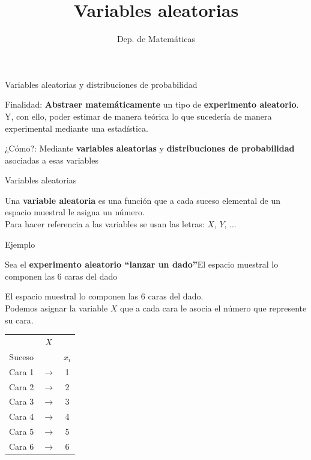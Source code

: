 \documentclass[11pt]{beamer}
\title{Variables aleatorias}
\date{}
\author{Dep. de Matemáticas}
\begin{document}
\begin{frame}
\titlepage
\end{frame}


\begin{frame}{Variables aleatorias y distribuciones de probabilidad}
\begin{block}{Finalidad:} \textbf{Abstraer matemáticamente} un tipo de \textbf{experimento aleatorio}. Y, con ello, poder estimar de manera teórica lo que sucedería de manera experimental mediante una estadística.
\end{block}

\pause

\begin{block}{¿Cómo?:} Mediante \textbf{variables aleatorias} y \textbf{distribuciones de probabilidad} asociadas a esas variables

\end{block}


\end{frame}

\begin{frame}{Variables aleatorias}
\begin{block}{}
Una \textbf{variable aleatoria} es una función que a cada suceso
elemental de un espacio muestral le asigna un número. \\ Para hacer referencia a las variables se usan las letras: $X$, $Y$, ...
\end{block}
\end{frame}

\begin{frame}{Ejemplo}
\begin{block}{}
Sea el \textbf{experimento aleatorio “lanzar un dado”}El espacio muestral lo componen las 6 caras del dado 
\end{block}
\pause
El espacio muestral lo componen las 6 caras del dado.\\
Podemos asignar la variable $X$ que a cada cara le asocia el número que represente su cara.
\begin{center}
\begin{tabular}{ccc}
 & $X$ &  \\
Suceso &  &  $x_i$\\ \hline 
Cara 1 & $\rightarrow$ & 1 \\ 
Cara 2 & $\rightarrow$ & 2 \\ 
Cara 3 & $\rightarrow$ & 3 \\ 
Cara 4 & $\rightarrow$ & 4 \\ 
Cara 5 & $\rightarrow$ & 5 \\ 
Cara 6 & $\rightarrow$ & 6 \\ 
\end{tabular} 
\end{center}
\end{frame}
\end{document}

